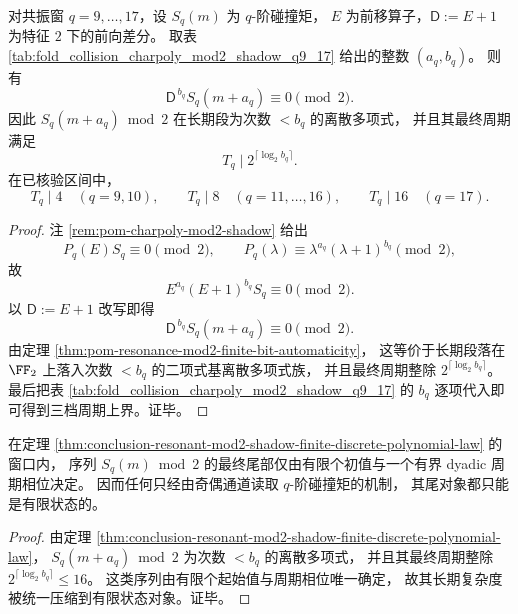 \begin{theorem}\label{thm:conclusion-resonant-mod2-shadow-finite-discrete-polynomial-law}
对共振窗 \(q=9,\dots,17\)，设 \(S_q(m)\) 为 \(q\)-阶碰撞矩，
\(E\) 为前移算子，\(\mathsf D:=E+1\) 为特征 \(2\) 下的前向差分。
取表 \ref{tab:fold_collision_charpoly_mod2_shadow_q9_17} 给出的整数 \((a_q,b_q)\)。
则有
\[
\mathsf D^{\,b_q}S_q(m+a_q)\equiv 0\pmod 2.
\]
因此 \(S_q(m+a_q)\bmod 2\) 在长期段为次数 \(<b_q\) 的离散多项式，
并且其最终周期满足
\[
T_q\mid 2^{\lceil \log_2 b_q\rceil}.
\]
在已核验区间中，
\[
T_q\mid 4 \quad (q=9,10),\qquad
T_q\mid 8 \quad (q=11,\dots,16),\qquad
T_q\mid 16 \quad (q=17).
\]
\end{theorem}
\begin{proof}
注 \ref{rem:pom-charpoly-mod2-shadow} 给出
\[
P_q(E)S_q\equiv 0\pmod 2,
\qquad
P_q(\lambda)\equiv \lambda^{a_q}(\lambda+1)^{b_q}\pmod 2,
\]
故
\[
E^{a_q}(E+1)^{b_q}S_q\equiv 0\pmod 2.
\]
以 \(\mathsf D:=E+1\) 改写即得
\[
\mathsf D^{\,b_q}S_q(m+a_q)\equiv 0\pmod 2.
\]
由定理 \ref{thm:pom-resonance-mod2-finite-bit-automaticity}，
这等价于长期段落在 \(\FF_2\) 上落入次数 \(<b_q\) 的二项式基离散多项式族，
并且最终周期整除 \(2^{\lceil \log_2 b_q\rceil}\)。
最后把表 \ref{tab:fold_collision_charpoly_mod2_shadow_q9_17} 的 \(b_q\) 逐项代入即可得到三档周期上界。证毕。
\end{proof}

\begin{corollary}[奇偶通道尾复杂度的有界性]\label{cor:conclusion-parity-tail-finite-state-object}
在定理 \ref{thm:conclusion-resonant-mod2-shadow-finite-discrete-polynomial-law} 的窗口内，
序列 \(S_q(m)\bmod 2\) 的最终尾部仅由有限个初值与一个有界 dyadic 周期相位决定。
因而任何只经由奇偶通道读取 \(q\)-阶碰撞矩的机制，
其尾对象都只能是有限状态的。
\end{corollary}
\begin{proof}
由定理 \ref{thm:conclusion-resonant-mod2-shadow-finite-discrete-polynomial-law}，
\(S_q(m+a_q)\bmod 2\) 为次数 \(<b_q\) 的离散多项式，
并且其最终周期整除 \(2^{\lceil \log_2 b_q\rceil}\le 16\)。
这类序列由有限个起始值与周期相位唯一确定，
故其长期复杂度被统一压缩到有限状态对象。证毕。
\end{proof}

